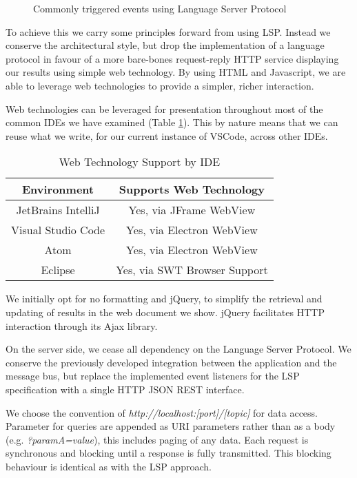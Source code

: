\begin{figure}[h!]
	\centering
	\caption{Commonly triggered events using Language Server Protocol}
	\label{fig:commonLSPEvents}
\end{figure}

To achieve this we carry some principles forward from using LSP. Instead we conserve the architectural style, but drop the implementation of a language protocol in favour of a more bare-bones request-reply HTTP service displaying our results using simple web technology. By using HTML and Javascript, we are able to leverage web technologies to provide a simpler, richer interaction. 

Web technologies can be leveraged for presentation throughout most of the common IDEs we have examined (Table \ref{table:webviewSupportByIDE}). This by nature means that we can reuse what we write, for our current instance of VSCode, across other IDEs.

\begin{table}[h!]
	\centering
	\begin{tabular}{|c|c|}
		\hline 
		Environment & Supports Web Technology \\ 
		\hline 
		\hline 
		JetBrains IntelliJ & Yes, via JFrame WebView \\ 
		\hline 
		Visual Studio Code & Yes, via Electron WebView  \\ 
		\hline 
		Atom & Yes, via Electron WebView  \\ 
		\hline 
		Eclipse & Yes, via SWT Browser Support \\ 
		\hline 
	\end{tabular} 
	\caption{Web Technology Support by IDE}
	\label{table:webviewSupportByIDE}
\end{table}

We initially opt for no formatting and jQuery, to simplify the retrieval and updating of results in the web document we show. jQuery facilitates HTTP interaction through its Ajax library. 

On the server side, we cease all dependency on the Language Server Protocol. We conserve the previously developed integration between the application and the message bus, but replace the implemented event listeners for the LSP specification with a single HTTP JSON REST interface. 

We choose the convention of \textit{http://localhost:[port]/[topic]} for data access. Parameter for queries are appended as URI parameters rather than as a body (e.g. \textit{?paramA=value}), this includes paging of any data. Each request is synchronous and blocking until a response is fully transmitted. This blocking behaviour is identical as with the LSP approach.


